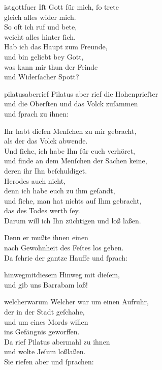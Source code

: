 \documentclass[tocstyle=ref-genre]{ees}
\begin{document}
{\begin{movement}{istgottfuer}
  \voice[Chor]
  Iſt Gott für mich, ſo trete\\
  gleich alles wider mich.\\
  So oft ich ruf und bete,\\
  weicht alles hinter ſich.\\
  Hab ich das Haupt zum Freunde,\\
  und bin geliebt bey Gott,\\
  was kann mir thun der Feinde\\
  und Widerſacher Spott?
\end{movement}

\begin{movement}{pilatusaberrief}
  \voice[Evangelist]
  Pilatus aber rief die Hohenprieſter\\
  und die Oberſten und das Volck zuſammen\\
  und ſprach zu ihnen:

  \voice[Pilatus]
  Ihr habt dieſen Menſchen zu mir gebracht,\\
  als der das Volck abwende.\\
  Und ſiehe, ich habe Ihn für euch verhöret,\\
  und finde an dem Menſchen der Sachen keine,\\
  deren ihr Ihn beſchuldiget.\\
  Herodes auch nicht,\\
  denn ich habe euch zu ihm geſandt,\\
  und ſiehe, man hat nichts auf Ihm gebracht,\\
  das des Todes werth ſey.\\
  Darum will ich Ihn züchtigen und loß laßen.

  \voice[Evangelist]
  Denn er mußte ihnen einen\\
  nach Gewohnheit des Feſtes los geben.\\
  Da ſchrie der gantze Hauffe und ſprach:
\end{movement}

\begin{movement}{hinwegmitdiesem}
  \voice[Chor]
  Hinweg mit dieſem,\\
  und gib uns Barrabam loß!
\end{movement}

\begin{movement}{welcherwarum}
  \voice[Evangelist]
  Welcher war um einen Aufruhr,\\
  der in der Stadt geſchahe,\\
  und um eines Mords willen\\
  ins Gefängnis geworffen.\\
  Da rief Pilatus abermahl zu ihnen\\
  und wolte Jeſum loßlaßen.\\
  Sie riefen aber und ſprachen:


\end{movement}}
\end{document}
